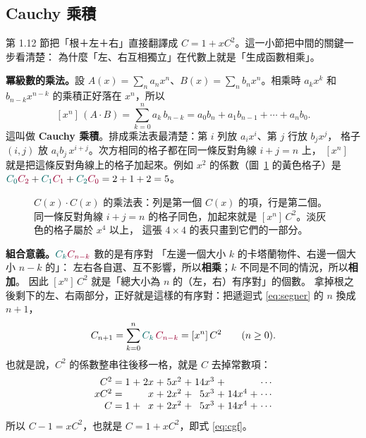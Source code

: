 

\subsection{Cauchy 乘積}\label{sec:m01}

第 1.12 節把「根＋左＋右」直接翻譯成 $C=1+xC^2$。這一小節把中間的關鍵一步看清楚：
為什麼「左、右互相獨立」在代數上就是「生成函數相乘」。

\textbf{冪級數的乘法。}設 $A(x)=\sum_n a_nx^n$、$B(x)=\sum_n b_nx^n$。相乘時
$a_kx^k$ 和 $b_{n-k}x^{n-k}$ 的乘積正好落在 $x^n$，所以
\begin{equation}\label{eq:m01-cauchy}
[x^n]\,(A\cdot B)=\sum_{k=0}^{n}a_k\,b_{n-k}=a_0b_n+a_1b_{n-1}+\cdots+a_nb_0 .
\end{equation}
這叫做 \textbf{Cauchy 乘積}。排成乘法表最清楚：第 $i$ 列放 $a_ix^i$、第 $j$ 行放 $b_jx^j$，
格子 $(i,j)$ 放 $a_ib_j\,x^{i+j}$。次方相同的格子都在同一條反對角線 $i+j=n$ 上，
$[x^n]$ 就是把這條反對角線上的格子加起來。例如 $x^2$ 的係數（圖~\ref{fig:m01-table} 的黃色格子）是
$\textcolor{cLeft}{C_0}\textcolor{cRight}{C_2}+\textcolor{cLeft}{C_1}\textcolor{cRight}{C_1}
+\textcolor{cLeft}{C_2}\textcolor{cRight}{C_0}=2+1+2=5$。

\begin{figure}[H]
\centering
\FigMiCauchy
\caption{$C(x)\cdot C(x)$ 的乘法表：\textcolor{cLeft}{列}是第一個 $C(x)$ 的項，\textcolor{cRight}{行}是第二個。
同一條反對角線 $i+j=n$ 的格子同色，加起來就是 $[x^n]\,C^2$。淡灰色的格子屬於 $x^4$ 以上，
這張 $4\times4$ 的表只畫到它們的一部分。}
\label{fig:m01-table}
\end{figure}

\textbf{組合意義。}$\textcolor{cLeft}{C_k}\textcolor{cRight}{C_{n-k}}$ 數的是有序對
「\textcolor{cLeft}{左邊}一個大小 $k$ 的卡塔蘭物件、\textcolor{cRight}{右邊}一個大小 $n-k$ 的」：
左右各自選、互不影響，所以\textbf{相乘}；$k$ 不同是不同的情況，所以\textbf{相加}。
因此 $[x^n]\,C^2$ 就是「總大小為 $n$ 的（左，右）有序對」的個數。
拿掉根之後剩下的左、右兩部分，正好就是這樣的有序對：把遞迴式 \eqref{eq:segner} 的 $n$ 換成 $n+1$，
\begin{equation}\label{eq:m01-shift}
C_{n+1}=\sum_{k=0}^{n}\textcolor{cLeft}{C_k}\,\textcolor{cRight}{C_{n-k}}=[x^n]\,C^2\qquad(n\ge0).
\end{equation}
也就是說，$C^2$ 的係數整串往後移一格，就是 $C$ 去掉常數項：
\[
\begin{array}{r@{\;}c@{\;}*{5}{r@{\;}c@{\;}}l}
C^2 &=& 1&+&2x&+&5x^2&+&14x^3&+& & &\cdots\\
xC^2 &=& & & x&+&2x^2&+&5x^3&+&14x^4&+&\cdots\\
C &=& 1&+&x&+&2x^2&+&5x^3&+&14x^4&+&\cdots
\end{array}
\]
所以 $C-1=xC^2$，也就是 $C=1+xC^2$，即式 \eqref{eq:cgf}。

